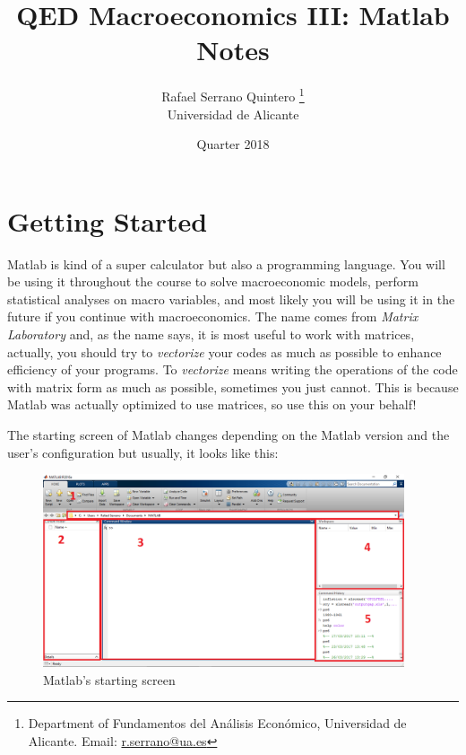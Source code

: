 \documentclass[a4paper,11pt]{article}
\title{\textbf{QED Macroeconomics III: Matlab Notes}}
\author{Rafael Serrano Quintero
\thanks{Department of Fundamentos del An{\'a}lisis Econ{\'o}mico, Universidad de Alicante. Email: \href{mailto:r.serrano@ua.es}{r.serrano@ua.es}} \\
Universidad de Alicante \\}
\date{\nth{3} Quarter 2018}
\begin{document}
\VerbatimFootnotes

\maketitle

\section{Getting Started}

Matlab is kind of a super calculator but also a programming language. You will be using it throughout the course to solve macroeconomic models, perform statistical analyses on macro variables, and most likely you will be using it in the future if you continue with macroeconomics. The name comes from \textit{Matrix Laboratory} and, as the name says, it is most useful to work with matrices, actually, you should try to \textit{vectorize} your codes as much as possible to enhance efficiency of your programs. To \textit{vectorize} means writing the operations of the code with matrix form as much as possible, sometimes you just cannot. This is because Matlab was actually optimized to use matrices, so use this on your behalf!

The starting screen of Matlab changes depending on the Matlab version and the user's configuration but usually, it looks like this:

\begin{figure}[htbp]
\centering
	\includegraphics[width = 0.95\textwidth]{matlab_initial.png}
	\caption{Matlab's starting screen}
\end{figure}
\end{document}

